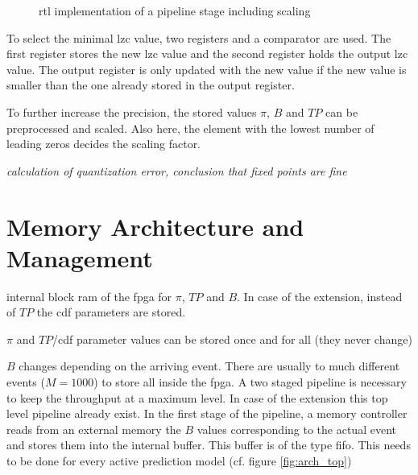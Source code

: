 \documentclass[mscthesis]{usiinfthesis}
\begin{document}
\begin{figure}
    \centering
    
    \caption{\acrshort{rtl} implementation of a pipeline stage including scaling}
    \label{fig:arch_step_scale}
\end{figure}

To select the minimal \gls{lzc} value, two registers and a comparator are used. The
first register stores the new \gls{lzc} value and the second register holds the output
\gls{lzc} value. The output register is only updated with the new value if the new
value is smaller than the one already stored in the output register.

To further increase the precision, the stored values $\pi$, $B$ and $TP$ can be
preprocessed and scaled. Also here, the element with the lowest number of
leading zeros decides the scaling factor.

\emph{\color{red}calculation of quantization error, conclusion that fixed points
are fine}

\section{Memory Architecture and Management}
\label{ch:design_mem}

internal block ram of the \gls{fpga} for $\pi$, $TP$ and $B$. In case of the
extension, instead of $TP$ the \gls{cdf} parameters are stored.

$\pi$ and $TP$/\gls{cdf} parameter values can be stored once and for all (they
never change)

$B$ changes depending on the arriving event. There are usually to much
different events ($M=1000$) to store all inside the \gls{fpga}. A two staged
pipeline is necessary to keep the throughput at a maximum level. In case of the
extension this top level pipeline already exist. In the first stage of the
pipeline, a memory controller reads from an external memory the $B$ values
corresponding to the actual event and stores them into the internal buffer.
This buffer is of the type \gls{fifo}. This needs to be done for every active
prediction model (cf.  figure \ref{fig:arch_top})
\end{document}

